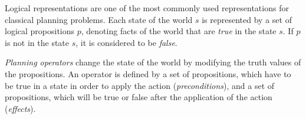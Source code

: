 

Logical representations are one of the most commonly used representations for classical planning problems. 
Each state of the world $s$ is represented by a set of logical propositions $p$, denoting facts of the world that are \textit{true} in the state $s$. 
If $p$ is not in the state $s$, it is considered to be \textit{false}.

\textit{Planning operators} change the state of the world by modifying the truth values of the propositions. 
An operator is defined by a set of propositions, which have to be true in a state in order to apply the action (\textit{preconditions}), and a set of propositions, which will be true or false after the application of the action (\textit{effects}).

